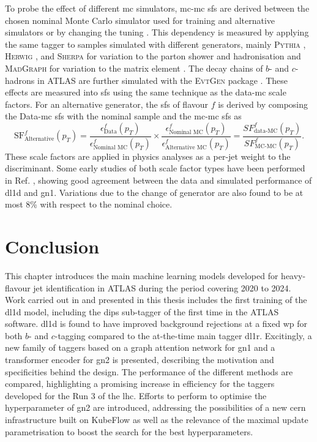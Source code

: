 To probe the effect of different \gls{mc} simulators, \gls{mc}-\gls{mc} \glspl{sf} are derived between the chosen nominal Monte Carlo simulator used for training and alternative simulators or by changing the tuning \cite{ATL-PHYS-PUB-2020-009}. This dependency is measured by applying the same tagger to samples simulated with different generators, mainly \textsc{Pythia} \cite{SJOSTRAND2015159}, \textsc{Herwig} \cite{bellm2017herwig}, and \textsc{Sherpa} \cite{sherpa2.2paper} for variation to the parton shower and hadronisation and \textsc{MadGraph} for variation to the matrix element \cite{madgraph}. The decay chains of $b$- and $c$-hadrons in ATLAS are further simulated with the \textsc{EvtGen} package \cite{LANGE2001152}. These effects are measured into \glspl{sf} using the same technique as the data-\gls{mc} scale factors. For an alternative generator, the \glspl{sf} of flavour $f$ is derived by composing the Data-\gls{mc} \glspl{sf} with the nominal sample and the \gls{mc}-\gls{mc} \glspl{sf} as \[\textrm{SF}^f_{\textrm{Alternative}}(p_T) = \frac{\epsilon^f_{\textrm{Data}}(p_T)}{\epsilon^f_{\textrm{Nominal MC}}(p_T)} \times \frac{\epsilon^f_{\textrm{Nominal MC}}(p_T)}{\epsilon^f_{\textrm{Alternative MC}}(p_T)} = \frac{SF^f_{\textrm{data-MC}}(p_T)}{SF^f_{\textrm{MC-MC}}(p_T)}.\] These scale factors are applied in physics analyses as a per-jet weight to the discriminant. Some early studies of both scale factor types have been performed in Ref. \cite{ATL-PLOT-FTAG-2023-01}, showing good agreement between the data and simulated performance of \gls{dl1d} and \gls{gn1}. Variations due to the change of generator are also found to be at most 8\% with respect to the nominal choice.

\section{Conclusion}
This chapter introduces the main machine learning models developed for heavy-flavour jet identification in ATLAS during the period covering 2020 to 2024. Work carried out in and presented in this thesis includes the first training of the \gls{dl1d} model, including the \gls{dips} sub-tagger of the first time in the ATLAS software. \gls{dl1d} is found to have improved background rejections at a fixed \gls{wp} for both $b$- and $c$-tagging compared to the at-the-time main tagger \gls{dl1r}. Excitingly, a new family of taggers based on a graph attention network for \gls{gn1} and a transformer encoder for \gls{gn2} is presented, describing the motivation and specificities behind the design. The performance of the different methods are compared, highlighting a promising increase in efficiency for the taggers developed for the Run 3 of the \gls{lhc}. Efforts to perform to optimise the hyperparameter of \gls{gn2} are introduced, addressing the possibilities of a new \gls{cern} infrastructure built on KubeFlow as well as the relevance of the maximal update parametrisation to boost the search for the best hyperparameters. 

